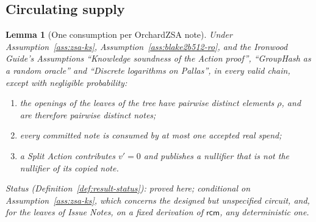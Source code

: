 \documentclass[11pt,a4paper]{article}
\newtheorem{lemma}[theorem]{Lemma}
\theoremstyle{definition}
\newcommand{\rcm}{\ensuremath{\mathsf{rcm}}}
\begin{document}
\FloatBarrier
\subsection{Circulating supply}\label{sec:security-supply}

\begin{lemma}[One consumption per OrchardZSA note]\label{lem:one-consumption}
Under Assumption~\ref{ass:zsa-ks}, Assumption~\ref{ass:blake2b512-ro}, and
the \emph{Ironwood Guide}'s Assumptions ``Knowledge soundness of the Action
proof'', ``GroupHash as a random oracle'' and ``Discrete logarithms on
Pallas'', in every valid chain, except with negligible probability:
\begin{enumerate}
\item[(a)] the openings of the leaves of the tree have pairwise distinct
  elements $\rho$, and are therefore pairwise distinct notes;
\item[(b)] every committed note is consumed by at most one accepted real
  spend;
\item[(c)] a Split Action contributes $v' = 0$ and publishes a nullifier
  that is not the nullifier of its copied note.
\end{enumerate}
Status (Definition~\ref{def:result-status}): proved here; conditional on
Assumption~\ref{ass:zsa-ks}, which concerns the designed but unspecified
circuit, and, for the leaves of Issue Notes, on a fixed derivation of
$\rcm$, any deterministic one.
\end{lemma}
\end{document}
